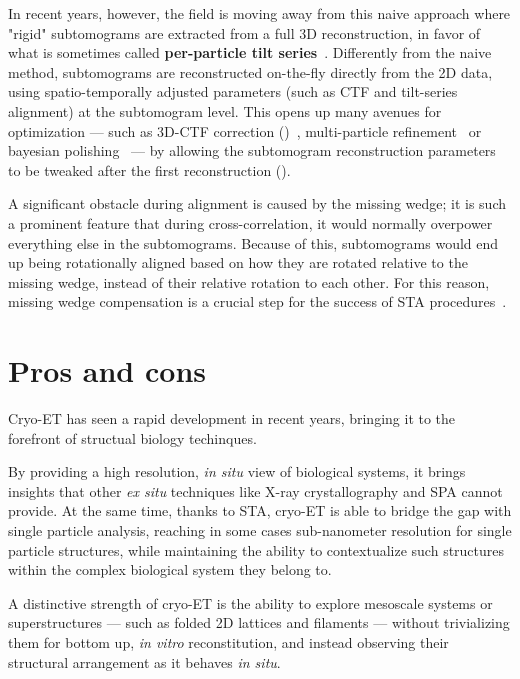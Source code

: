 In recent years, however, the field is moving away from this naive approach where "rigid" subtomograms are extracted from a full 3D reconstruction, in favor of what is sometimes called \textbf{per-particle tilt series}~\cite{himesEmClaritySoftwareHighresolution2018,zivanovBayesianApproachSingleparticle2022,tegunovRealtimeCryoelectronMicroscopy2019,chenCompleteDataProcessing2019}.
Differently from the naive method, subtomograms are reconstructed on-the-fly directly from the 2D data, using spatio-temporally adjusted parameters (such as CTF and tilt-series alignment) at the subtomogram level.
This opens up many avenues for optimization --- such as 3D-CTF correction ()~\cite{turonovaEfficient3DCTFCorrection2017}, multi-particle refinement~\cite{tegunovMultiparticleCryoEMRefinement2021} or bayesian polishing~\cite{zivanovBayesianApproachSingleparticle2022} --- by allowing the subtomogram reconstruction parameters to be tweaked after the first reconstruction ().

A significant obstacle during alignment is caused by the missing wedge; it is such a prominent feature that during cross-correlation, it would normally overpower everything else in the subtomograms.
Because of this, subtomograms would end up being rotationally aligned based on how they are rotated relative to the missing wedge, instead of their relative rotation to each other.
For this reason, missing wedge compensation is a crucial step for the success of STA procedures~\cite{galaz-montoyaAlignmentAlgorithmsPerparticle2016}.

\section{Pros and cons}

Cryo-ET has seen a rapid development in recent years, bringing it to the forefront of structual biology techinques.

By providing a high resolution, \textit{in situ} view of biological systems, it brings insights that other \textit{ex situ} techniques like X-ray crystallography and SPA cannot provide.
At the same time, thanks to STA, cryo-ET is able to bridge the gap with single particle analysis, reaching in some cases sub-nanometer resolution for single particle structures, while maintaining the ability to contextualize such structures within the complex biological system they belong to.

A distinctive strength of cryo-ET is the ability to explore mesoscale systems or superstructures --- such as folded 2D lattices and filaments --- without trivializing them for bottom up, \textit{in vitro} reconstitution, and instead observing their structural arrangement as it behaves \textit{in situ}.

